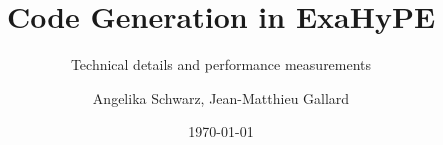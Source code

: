 \documentclass{acm_proc_article-sp}
\begin{document}
\title{Code Generation in ExaHyPE}%
\subtitle{Technical details and performance measurements}
%
%
%
%
%

%
\author{
%
%
\alignauthor
Angelika Schwarz, Jean-Matthieu Gallard
}

\date{\today}
\end{document}
